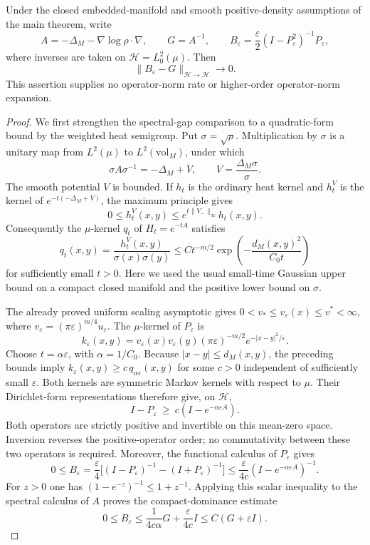 \begin{proposition}
\label{prop:operator-norm-convergence}
Under the closed embedded-manifold and smooth positive-density
assumptions of the main theorem, write
\[
 A=-\Delta_M-\nabla\log\rho\cdot\nabla,
 \qquad G=A^{-1},\qquad
 B_\varepsilon=
   \frac{\varepsilon}{2}(I-P_\varepsilon^2)^{-1}P_\varepsilon,
\]
where inverses are taken on $\mathcal H=L^2_0(\mu)$.
Then
\[
 \|B_\varepsilon-G\|_{\mathcal H\to\mathcal H}
 \longrightarrow0.
\]
This assertion supplies no operator-norm rate or higher-order
operator-norm expansion.
\end{proposition}

\begin{proof}
We first strengthen the spectral-gap comparison to a quadratic-form
bound by the weighted heat semigroup.  Put $\sigma=\sqrt\rho$.
Multiplication by $\sigma$ is a unitary map from $L^2(\mu)$ to
$L^2(\mathrm{vol}_M)$, under which
\[
 \sigma A\sigma^{-1}=-\Delta_M+V,
 \qquad V=\frac{\Delta_M\sigma}{\sigma}.
\]
The smooth potential $V$ is bounded.  If $h_t$ is the ordinary heat
kernel and $h_t^V$ is the kernel of $e^{-t(-\Delta_M+V)}$, the
maximum principle gives
\[
 0\le h_t^V(x,y)\le e^{t\|V_-\|_\infty}h_t(x,y).
\]
Consequently the $\mu$-kernel $q_t$ of $H_t=e^{-tA}$ satisfies
\[
 q_t(x,y)=\frac{h_t^V(x,y)}{\sigma(x)\sigma(y)}
 \le C t^{-m/2}
       \exp\!\left(-\frac{d_M(x,y)^2}{C_0t}\right)
\]
for sufficiently small $t>0$.  Here we used the usual small-time
Gaussian upper bound on a compact closed manifold and the positive
lower bound on $\sigma$.

The already proved uniform scaling asymptotic gives
$0<v_*\le v_\varepsilon(x)\le v^*<\infty$, where
$v_\varepsilon=(\pi\varepsilon)^{m/4}u_\varepsilon$.
The $\mu$-kernel of $P_\varepsilon$ is
\[
 k_\varepsilon(x,y)=
 v_\varepsilon(x)v_\varepsilon(y)
 (\pi\varepsilon)^{-m/2}e^{-|x-y|^2/\varepsilon}.
\]
Choose $t=\alpha\varepsilon$, with $\alpha=1/C_0$.
Because $|x-y|\le d_M(x,y)$, the preceding bounds imply
$k_\varepsilon(x,y)\ge c\,q_{\alpha\varepsilon}(x,y)$ for some
$c>0$ independent of sufficiently small $\varepsilon$.
Both kernels are symmetric Markov kernels with respect to $\mu$.
Their Dirichlet-form representations therefore give, on
$\mathcal H$,
\[
 I-P_\varepsilon\ \ge\ c(I-e^{-\alpha\varepsilon A}).
\]
Both operators are strictly positive and invertible on this
mean-zero space.  Inversion reverses the positive-operator order;
no commutativity between these two operators is required.  Moreover,
the functional calculus of $P_\varepsilon$ gives
\[
 0\le B_\varepsilon
 =\frac{\varepsilon}{4}
  \bigl[(I-P_\varepsilon)^{-1}-(I+P_\varepsilon)^{-1}\bigr]
 \le\frac{\varepsilon}{4c}
       (I-e^{-\alpha\varepsilon A})^{-1}.
\]
For $z>0$ one has $(1-e^{-z})^{-1}\le1+z^{-1}$.
Applying this scalar inequality to the spectral calculus of $A$
proves the compact-dominance estimate
\begin{equation}
\label{eq:compact-dominance}
 0\le B_\varepsilon
 \le\frac1{4c\alpha}G+\frac{\varepsilon}{4c}I
 \le C(G+\varepsilon I).
\end{equation}


\end{proof}
